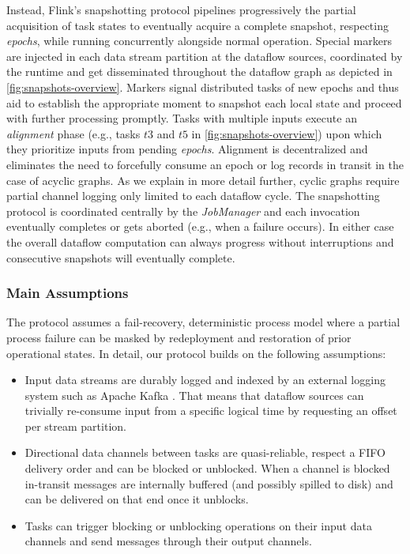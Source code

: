 Instead, Flink's snapshotting protocol pipelines progressively the partial acquisition of task states to eventually acquire a complete snapshot, respecting \emph{epochs}, while running concurrently alongside normal operation. Special markers are injected in each data stream partition at the dataflow sources, coordinated by the runtime and get disseminated throughout the dataflow graph as depicted in \autoref{fig:snapshots-overview}. Markers signal distributed tasks of new epochs and thus aid to establish the appropriate moment to snapshot each local state and proceed with further processing promptly. Tasks with multiple inputs execute an \emph{alignment} phase (e.g., tasks $t3$ and $t5$ in \autoref{fig:snapshots-overview}) upon which they prioritize inputs from pending \emph{epochs}. Alignment is decentralized and eliminates the need to forcefully consume an epoch or log records in transit in the case of acyclic graphs. As we explain in more detail further, cyclic graphs require partial channel logging only limited to each dataflow cycle. The snapshotting protocol is coordinated centrally by the \emph{JobManager} and each invocation eventually completes or gets aborted (e.g., when a failure occurs). In either case the overall dataflow computation can always progress without interruptions and consecutive snapshots will eventually complete.

\subsubsection{Main Assumptions}

The protocol assumes a fail-recovery, deterministic process model \cite{elnozahy2002survey} where a partial process failure can be masked by redeployment and restoration of prior operational states. In detail, our protocol builds on the following assumptions:

\begin{itemize}
	\item Input data streams are durably logged and indexed by an external logging system such as Apache Kafka \cite{kreps2011kafka}. That means that dataflow sources can trivially re-consume input from a specific logical time by requesting an offset per stream partition. 
	\item Directional data channels between tasks are quasi-reliable, respect a FIFO delivery order and can be blocked or unblocked. When a channel is blocked in-transit messages are internally buffered (and possibly spilled to disk) and can be delivered on that end once it unblocks.
	\item Tasks can trigger blocking or unblocking operations on their input data channels and send messages through their output channels.
\end{itemize}

